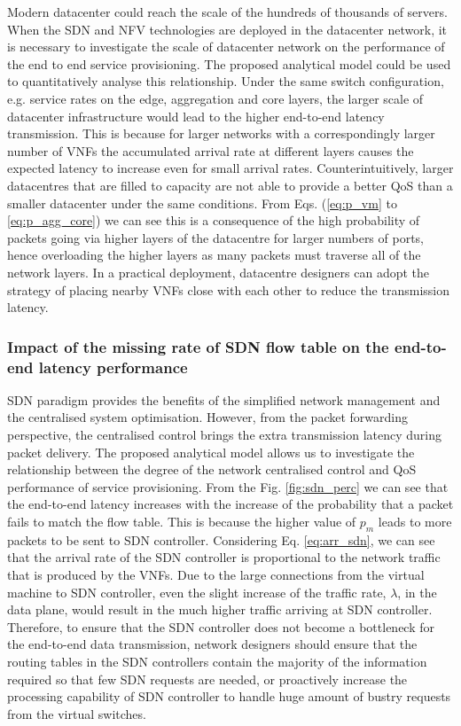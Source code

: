 	Modern datacenter could reach the scale of the hundreds of thousands of servers. When the SDN and NFV technologies are deployed in the datacenter network, it is necessary to investigate the scale of datacenter network on the performance of the end to end service provisioning.  The proposed analytical model could be used to quantitatively analyse this relationship. Under the same switch configuration, e.g. service rates on the edge, aggregation and core layers, the larger scale of datacenter infrastructure would lead to the higher end-to-end latency transmission. This is because for larger networks with a correspondingly larger number of VNFs the accumulated arrival rate at different layers causes the expected latency to increase even for small arrival rates. Counterintuitively, larger datacentres that are filled to capacity are not able to provide a better QoS than a smaller datacenter under the same conditions. From Eqs. (\ref{eq:p_vm} to \ref{eq:p_agg_core}) we can see this is a consequence of the high probability of packets going via higher layers of the datacentre for larger numbers of ports, hence overloading the higher layers as many packets must traverse all of the network layers. In a practical deployment, datacentre designers can adopt the strategy of placing nearby VNFs close with each other to reduce the transmission latency.
	
	\subsubsection{Impact of the missing rate of SDN flow table on the end-to-end latency performance}
	
	SDN paradigm provides the benefits of the simplified network management and the centralised system optimisation. However, from the packet forwarding perspective, the centralised control brings the extra transmission latency during packet delivery. The proposed analytical model allows us to investigate the relationship between the degree of the network centralised control and QoS performance of service provisioning. From the Fig. \ref{fig:sdn_perc} we can see that the end-to-end latency increases with the increase of the probability that a packet fails to match the flow table. This is because the higher value of $p_m$ leads to more packets to be sent to SDN controller. Considering Eq. \ref{eq:arr_sdn}, we can see that the arrival rate of the SDN controller is proportional to the network traffic that is produced by the VNFs. Due to the large connections from the virtual machine to SDN controller, even the slight increase of the traffic rate, $\lambda$, in the data plane, would result in the much higher traffic arriving at SDN controller. Therefore, to ensure that the SDN controller does not become a bottleneck for the end-to-end data transmission, network designers should ensure that the routing tables in the SDN controllers contain the majority of the information required so that few SDN requests are needed, or proactively increase the processing capability of SDN controller to handle huge amount of bustry requests from the virtual switches.